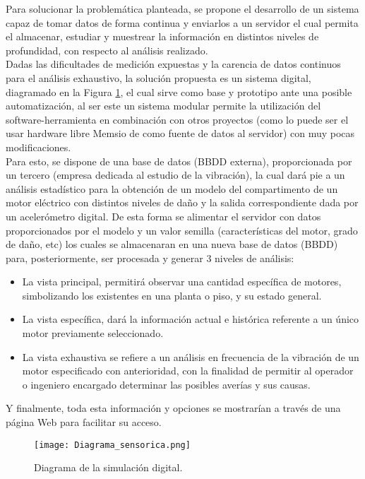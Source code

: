 

Para solucionar la problemática planteada, se propone el desarrollo de un sistema capaz de tomar datos de forma continua y enviarlos  a un servidor el cual permita el almacenar, estudiar y muestrear la información en distintos niveles de profundidad, con respecto al análisis realizado.\\


Dadas las dificultades de medición expuestas y la carencia de datos continuos para el análisis exhaustivo, la solución propuesta es un sistema digital, diagramado en la Figura \ref{diagrama}, el cual sirve como base y prototipo ante  una posible automatización, al ser este un sistema modular permite la utilización del software-herramienta en combinación con otros proyectos (como lo puede ser el usar hardware libre Memsio de \textcite{Koene} como fuente de datos al servidor) con muy pocas modificaciones.\\


Para esto, se dispone de una base de datos (BBDD externa), proporcionada por un tercero (empresa dedicada al estudio de la vibración), la cual dará pie a un análisis estadístico para la obtención de un modelo del compartimento de un motor eléctrico con distintos niveles de daño y la salida correspondiente dada por un acelerómetro digital. De esta forma se alimentar el servidor con datos proporcionados por el modelo y un valor semilla (características del motor, grado de daño, etc) los cuales se almacenaran en una nueva base de datos (BBDD) para, posteriormente, ser procesada y  generar 3 niveles de análisis: \\


\begin{itemize}
\item La vista principal, permitirá observar una cantidad específica de motores, simbolizando los existentes en una planta o piso, y su estado general.

\item La vista específica, dará la información actual e histórica referente a un único motor previamente seleccionado.

\item La vista exhaustiva se refiere a un análisis en frecuencia de la vibración de un motor especificado con anterioridad, con la finalidad de permitir al operador o ingeniero encargado determinar las posibles averías y sus causas.
\end{itemize}


Y finalmente, toda esta información y opciones se mostrarían a través de una página Web para facilitar su acceso.\\



\begin{figure}[htb]
\centering
\caption{Diagrama de la simulación digital.}
\label{diagrama}
\texttt{[image: Diagrama\_sensorica.png]}
\end{figure}
